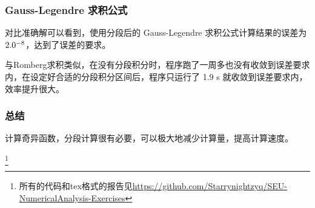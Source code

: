 \subsubsection{Gauss-Legendre 求积公式}

对比准确解可以看到，使用分段后的 Gauss-Legendre 求积公式计算结果的误差为 $2.0\time 10^{-8}$，达到了误差的要求。

与Romberg求积类似，在没有分段积分时，程序跑了一周多也没有收敛到误差要求内，在设定好合适的分段积分区间后，程序只运行了 1.9 s 就收敛到误差要求内，效率提升很大。

\subsubsection{总结}

计算奇异函数，分段计算很有必要，可以极大地减少计算量，提高计算速度。

\footnote{所有的代码和tex格式的报告见\href{https://github.com/Starrynightzyq/SEU-NumericalAnalysis-Exercises.git}{https://github.com/Starrynightzyq/SEU-NumericalAnalysis-Exercises}}

